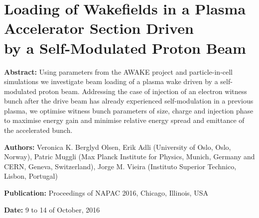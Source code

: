 %
%

\chapter[Loading of Wakefields in a Plasma Accelerator Section Driven by a Self-Modulated\\Proton Beam, \emph{Proceedings of NAPAC 2016}]%
        {Loading of Wakefields in a Plasma Accelerator Section Driven\\by a Self-Modulated Proton Beam}
\label{Pub:NAPAC16}

\begin{hangparas}{10mm}{1}

    \textbf{Abstract:}
    Using parameters from the AWAKE project and particle-in-cell simulations we investigate beam loading of a plasma
    wake driven by a self-modulated proton beam. Addressing the case of injection of an electron witness bunch after
    the drive beam has already experienced self-modulation in a previous plasma, we optimise witness bunch parameters of
    size, charge and injection phase to maximise energy gain and minimise relative energy spread and emittance of the
    accelerated bunch.

    \vspace{5mm}

    \textbf{Authors:}
    Veronica K. Berglyd Olsen, Erik Adli (University of Oslo, Oslo, Norway),
    Patric Muggli (Max Planck Institute for Physics, Munich, Germany and CERN, Geneva, Switzerland),
    Jorge M. Vieira (Instituto Superior Technico, Lisbon, Portugal)

    \vspace{5mm}

    \textbf{Publication:}
    Proceedings of NAPAC 2016, Chicago, Illinois, USA \cite{berglyd_olsen:2016}

    \vspace{5mm}

    \textbf{Date:} 9 to 14 of October, 2016


\end{hangparas}
